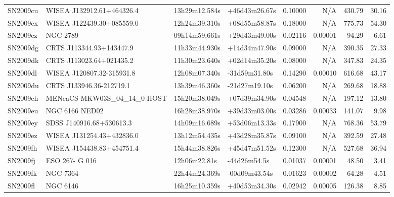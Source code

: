 \begin{longtable}{llllrrrr}
SN2009cu         &       WISEA J132912.61+464326.4 &   13h29m12.584s &   +46d43m26.67s &  0.10000 &      N/A &   430.79 &       30.16 \\
SN2009cx         &       WISEA J122439.30+085559.0 &   12h24m39.310s &   +08d55m58.87s &  0.18000 &      N/A &   775.73 &       54.30 \\
SN2009cz         &                        NGC 2789 &   09h14m59.661s &   +29d43m49.00s &  0.02116 &  0.00001 &    94.29 &        6.61 \\
SN2009dg         &        CRTS J113344.93+143447.9 &   11h33m44.930s &   +14d34m47.90s &  0.09000 &      N/A &   390.35 &       27.33 \\
SN2009dk         &        CRTS J113023.64+021435.2 &   11h30m23.640s &   +02d14m35.20s &  0.08000 &      N/A &   347.83 &       24.35 \\
SN2009dl         &       WISEA J120807.32-315931.8 &   12h08m07.340s &   -31d59m31.80s &  0.14290 &  0.00010 &   616.68 &       43.17 \\
SN2009du         &        CRTS J133946.36-212719.1 &   13h39m46.360s &   -21d27m19.10s &  0.06200 &      N/A &   269.68 &       18.88 \\
SN2009eh         &     MENeaCS MKW03S_04_14_0 HOST &   15h20m38.049s &   +07d39m34.90s &  0.04548 &      N/A &   197.12 &       13.80 \\
SN2009eu         &                  NGC 6166 NED02 &   16h28m38.970s &   +39d33m03.00s &  0.03286 &  0.00033 &   141.07 &        9.98 \\
SN2009ey         &        SDSS J140916.68+530613.3 &   14h09m16.689s &   +53d06m13.33s &  0.17900 &      N/A &   768.36 &       53.79 \\
SN2009ez         &       WISEA J131254.43+432836.0 &   13h12m54.435s &   +43d28m35.87s &  0.09100 &      N/A &   392.59 &       27.48 \\
SN2009fh         &       WISEA J154438.83+454751.4 &   15h44m38.826s &   +45d47m51.52s &  0.12300 &      N/A &   527.68 &       36.94 \\
SN2009fj         &                  ESO 267- G 016 &    12h06m22.81s &    -44d26m54.5s &  0.01037 &  0.00001 &    48.50 &        3.41 \\
SN2009fk         &                        NGC 7364 &   22h44m24.369s &   -00d09m43.54s &  0.01623 &  0.00002 &    64.28 &        4.51 \\
SN2009fl         &                        NGC 6146 &   16h25m10.359s &   +40d53m34.30s &  0.02942 &  0.00005 &   126.38 &        8.85 \\

\end{longtable}
